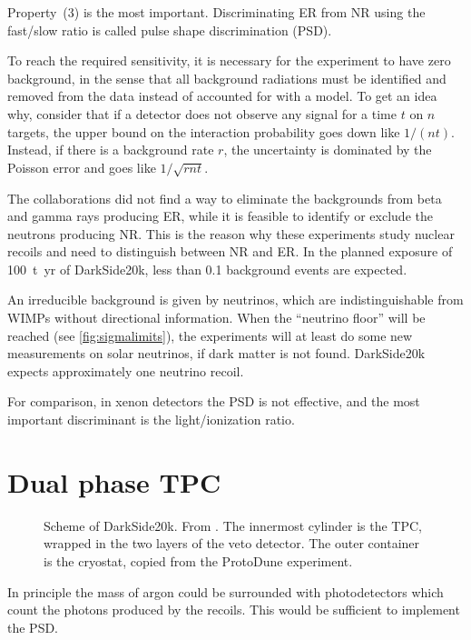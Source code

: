 Property~(3) is the most important. Discriminating ER from NR using the
fast/slow ratio is called pulse shape discrimination (PSD).

To reach the required sensitivity, it is necessary for the experiment to have
zero background, in the sense that all background radiations must be identified
and removed from the data instead of accounted for with a model. To get an idea
why, consider that if a detector does not observe any signal for a time $t$ on
$n$ targets, the upper bound on the interaction probability goes down like
$1/(nt)$. Instead, if there is a background rate $r$, the uncertainty is
dominated by the Poisson error and goes like $1/\sqrt{rnt}$.

The collaborations did not find a way to eliminate the backgrounds from beta
and gamma rays producing ER, while it is feasible to identify or exclude the
neutrons producing NR. This is the reason why these experiments study nuclear
recoils and need to distinguish between NR and ER. In the planned exposure of
\SI{100}{t yr} of DarkSide20k, less than 0.1 background events are expected.

An irreducible background is given by neutrinos, which are indistinguishable
from WIMPs without directional information. When the ``neutrino floor'' will be
reached (see \autoref{fig:sigmalimits}), the experiments will at least do some
new measurements on solar neutrinos, if dark matter is not found. DarkSide20k
expects approximately one neutrino recoil.

For comparison, in xenon detectors the PSD is not effective, and the most
important discriminant is the light/ionization ratio.

\section{Dual phase TPC}

\begin{figure}
    
    
    \caption{\label{fig:darkside20k} Scheme of DarkSide20k. From
    \cite[2]{aalseth2019}. The innermost cylinder is the TPC, wrapped in the
    two layers of the veto detector. The outer container is the cryostat,
    copied from the ProtoDune experiment.}
    
\end{figure}

In principle the mass of argon could be surrounded with photodetectors which
count the photons produced by the recoils. This would be sufficient to
implement the PSD.


